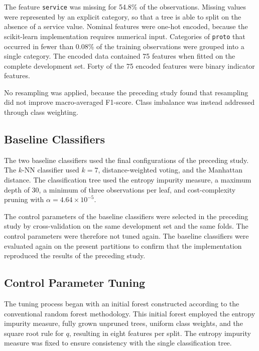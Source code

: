 \documentclass[conference]{IEEEtran}
\begin{document}
The feature \texttt{service} was missing for 54.8\% of the observations. Missing values were represented by an explicit category, so that a tree is able to split on the absence of a service value. Nominal features were one-hot encoded, because the scikit-learn implementation requires numerical input. Categories of \texttt{proto} that occurred in fewer than 0.08\% of the training observations were grouped into a single category. The encoded data contained 75 features when fitted on the complete development set. Forty of the 75 encoded features were binary indicator features.

No resampling was applied, because the preceding study found that resampling did not improve macro-averaged F1-score. Class imbalance was instead addressed through class weighting.

\subsection{Baseline Classifiers}

The two baseline classifiers used the final configurations of the preceding study. The $k$-NN classifier used $k=7$, distance-weighted voting, and the Manhattan distance. The classification tree used the entropy impurity measure, a maximum depth of 30, a minimum of three observations per leaf, and cost-complexity pruning with $\alpha=4.64\times10^{-5}$.

The control parameters of the baseline classifiers were selected in the preceding study by cross-validation on the same development set and the same folds. The control parameters were therefore not tuned again. The baseline classifiers were evaluated again on the present partitions to confirm that the implementation reproduced the results of the preceding study.

\subsection{Control Parameter Tuning}

The tuning process began with an initial forest constructed according to the conventional random forest methodology. This initial forest employed the entropy impurity measure, fully grown unpruned trees, uniform class weights, and the square root rule for $q$, resulting in eight features per split. The entropy impurity measure was fixed to ensure consistency with the single classification tree.
\end{document}
